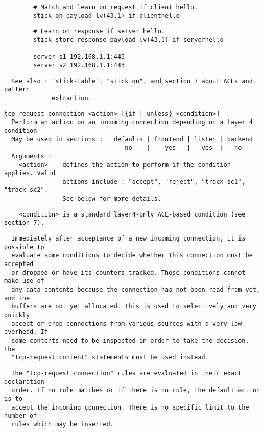 \begin{verbatim}
        # Match and learn on request if client hello.
        stick on payload_lv(43,1) if clienthello
\end{verbatim}

\begin{verbatim}
        # Learn on response if server hello.
        stick store-response payload_lv(43,1) if serverhello
        
        server s1 192.168.1.1:443
        server s2 192.168.1.1:443
\end{verbatim}

\begin{verbatim}
  See also : "stick-table", "stick on", and section 7 about ACLs and pattern
             extraction.
\end{verbatim}

\begin{verbatim}
tcp-request connection <action> [{if | unless} <condition>]
  Perform an action on an incoming connection depending on a layer 4 condition
  May be used in sections :   defaults | frontend | listen | backend
                                 no    |    yes   |   yes  |   no
  Arguments :
    <action>    defines the action to perform if the condition applies. Valid
                actions include : "accept", "reject", "track-sc1", "track-sc2".
                See below for more details.
\end{verbatim}

\begin{verbatim}
    <condition> is a standard layer4-only ACL-based condition (see section 7).
\end{verbatim}

\begin{verbatim}
  Immediately after acceptance of a new incoming connection, it is possible to
  evaluate some conditions to decide whether this connection must be accepted
  or dropped or have its counters tracked. Those conditions cannot make use of
  any data contents because the connection has not been read from yet, and the
  buffers are not yet allocated. This is used to selectively and very quickly
  accept or drop connections from various sources with a very low overhead. If
  some contents need to be inspected in order to take the decision, the
  "tcp-request content" statements must be used instead.
\end{verbatim}

\begin{verbatim}
  The "tcp-request connection" rules are evaluated in their exact declaration
  order. If no rule matches or if there is no rule, the default action is to
  accept the incoming connection. There is no specific limit to the number of
  rules which may be inserted.
\end{verbatim}

